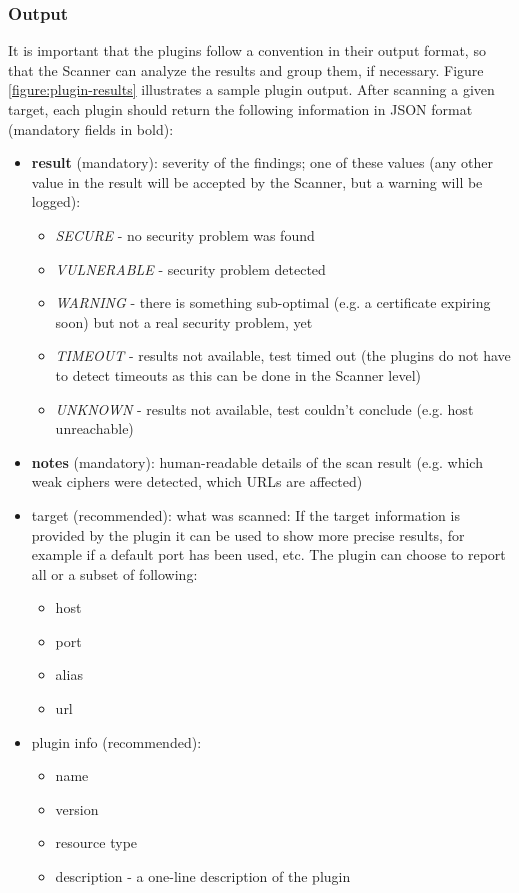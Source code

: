 \subsubsection{Output}
It is important that the plugins follow a convention in their output format, so that the Scanner can analyze the results and group them, if necessary. Figure \ref{figure:plugin-results} illustrates a sample plugin output. After scanning a given target, each plugin should return the following information in JSON format (mandatory fields in bold): 
\begin{itemize}


   \item \textbf{result} (mandatory): severity of the findings; one of these values (any other value in the result will be accepted by the Scanner, but a warning will be logged):
    \begin{itemize}
    

        \item \textit{SECURE} - no security problem was found
        \item  \textit{VULNERABLE} - security problem detected
        \item  \textit{WARNING} - there is something sub-optimal (e.g. a certificate expiring soon) but not a real security problem, yet
        \item  \textit{TIMEOUT} - results not available, test timed out (the plugins do not have to detect timeouts as this can be done in the Scanner level) 
        \item  \textit{UNKNOWN} - results not available, test couldn't conclude (e.g. host unreachable)
      
            \end{itemize}
\item      \textbf{notes} (mandatory): human-readable details of the scan result (e.g. which weak ciphers were detected, which URLs are affected)
\item      target (recommended): what was scanned: If the target information is provided by the plugin it can be used to show more precise results, for example if a default port has been used, etc. The plugin can choose to report all or a subset of following:
\begin{itemize}


\item        host
\item    port
\item    alias
\item    url 
\end{itemize}
\item    plugin info (recommended):
\begin{itemize}
\item        name
\item        version
\item    resource type
\item    description - a one-line description of the plugin 
\end{itemize}
\end{itemize}




